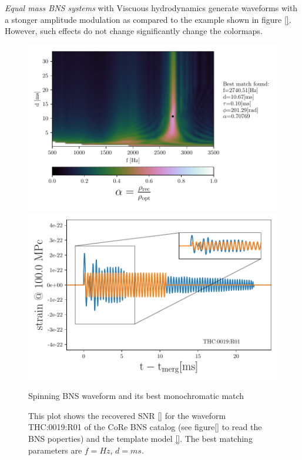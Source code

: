 \FloatBarrier


\textit{Equal mass BNS systems} with Viscuous hydrodynamics generate waveforms with a stonger amplitude modulation as compared to the example shown in figure \ref{}. However, such effects do not change significantly change the colormaps.

\begin{figure}[!htbp]
\begin{center}
\begin{minipage}[t]{0.5\linewidth}
\vspace{0pt}
\includegraphics[scale=0.6,trim={2mm 0 35mm 0},clip]{images/Data_analysis/results/2D_grid_11.pdf}
\end{minipage}%
\begin{minipage}[t]{0.5\linewidth}
\vspace{20pt}
\includegraphics[scale=0.45]{images/Data_analysis/results/2D_grid_12.pdf}
\end{minipage}
\captionsetup{width=0.8\textwidth}
\caption{Spinning BNS waveform and its best monochromatic match}
\caption*{This plot shows the recovered SNR \ref{} for the waveform THC:0019:R01 of the CoRe BNS catalog \cite{}(see figure\ref{} to read the BNS poperties) and the template model \ref{}. The best matching parameters are $f=Hz$, $d=ms$.}
\end{center}
\end{figure}

